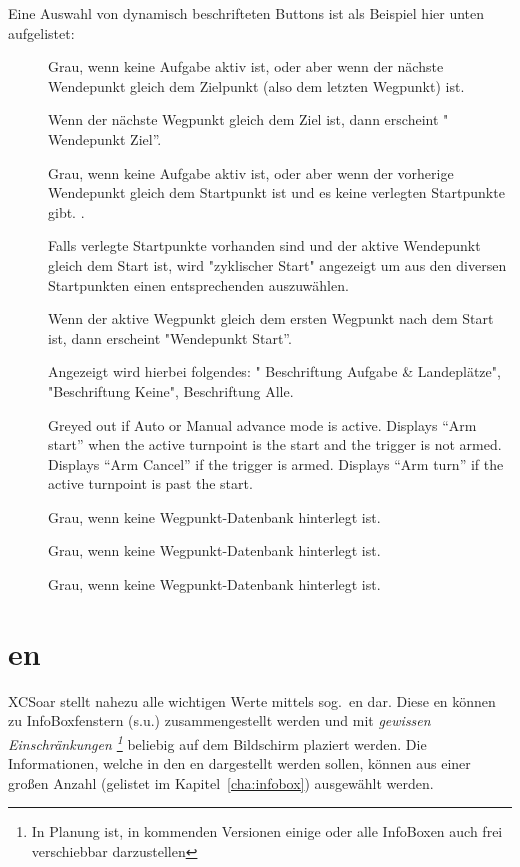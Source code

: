Eine Auswahl von dynamisch beschrifteten Buttons ist als Beispiel hier unten aufgelistet:

\begin{description}
\item[]
  Grau, wenn keine  Aufgabe aktiv ist, oder aber wenn der nächste Wendepunkt gleich dem Zielpunkt (also dem letzten Wegpunkt) ist.

 Wenn der nächste Wegpunkt gleich dem Ziel ist, dann erscheint " Wendepunkt Ziel''.
\item[]
  Grau, wenn keine  Aufgabe aktiv ist, oder aber wenn der vorherige Wendepunkt gleich dem Startpunkt ist und es keine verlegten Startpunkte gibt. .

  Falls verlegte Startpunkte vorhanden sind und der aktive Wendepunkt gleich dem Start ist, wird "zyklischer Start" angezeigt um aus den diversen Startpunkten einen entsprechenden auszuwählen.

Wenn der aktive Wegpunkt gleich dem ersten Wegpunkt nach dem Start ist, dann erscheint  "Wendepunkt Start''.
\item[]
Angezeigt wird hierbei folgendes: " Beschriftung Aufgabe \& Landeplätze", "Beschriftung Keine", Beschriftung Alle.

\item[]
  Greyed out if Auto or Manual advance mode is active. Displays ``Arm
  start'' when the active turnpoint is the start and the trigger is
  not armed. Displays ``Arm Cancel'' if the trigger is armed.
  Displays ``Arm turn'' if the active turnpoint is past the start.
\item[]
 Grau,  wenn keine Wegpunkt-Datenbank hinterlegt ist.
 \item[]
  Grau,  wenn keine Wegpunkt-Datenbank hinterlegt ist.
\item[]
  Grau,  wenn keine Wegpunkt-Datenbank hinterlegt ist.
\end{description}

\section{{\InfoBox}en}

\textsf{XCSoar} stellt nahezu alle wichtigen Werte mittels  sog.\  {\InfoBox}en dar. 
Diese {\InfoBox}en können zu InfoBoxfenstern (s.u.) zusammengestellt werden und mit
\emph{gewissen Einschränkungen \footnote{In Planung ist, in kommenden Versionen einige oder alle 
InfoBoxen auch frei verschiebbar darzustellen}} beliebig auf dem Bildschirm plaziert werden. 
Die Informationen, welche in den  {\InfoBox}en dargestellt werden sollen,  können aus einer großen Anzahl (gelistet im Kapitel~\ref{cha:infobox}) ausgewählt werden.

